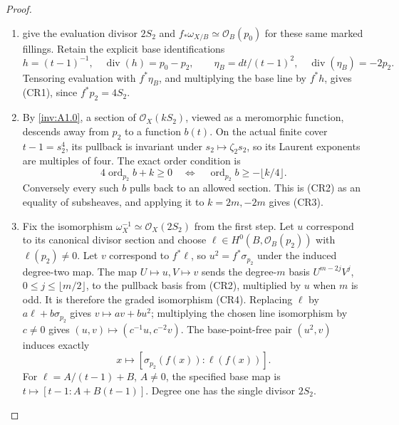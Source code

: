 \begin{proof}
\begin{enumerate}[label=\arabic*.,leftmargin=*]
\item \cite[Lemma~9.10(ii), p.~70, and Proposition~9.11,
pp.~70--71]{AC2026} give the evaluation divisor \(2S_2\) and
\(f_*\omega_{X/B}\simeq\mathcal O_B(p_0)\) for these same
marked fillings. Retain the explicit base identifications
\[
 h=(t-1)^{-1},\quad \operatorname{div}(h)=p_0-p_2,\qquad
 \eta_B=dt/(t-1)^2,\quad\operatorname{div}(\eta_B)=-2p_2.
\]
Tensoring evaluation with \(f^*\eta_B\), and multiplying the
base line by \(f^*h\), gives (CR1), since \(f^*p_2=4S_2\).

\item By \cref{inv:A1.0}, a section of
\(\mathcal O_X(kS_2)\), viewed as a meromorphic function,
descends away from \(p_2\) to a function \(b(t)\).
On the actual finite cover \(t-1=s_2^4\), its pullback is
invariant under \(s_2\mapsto\zeta_2s_2\), so its Laurent
exponents are multiples of four. The exact order condition is
\[
 4\operatorname{ord}_{p_2}b+k\ge0
 \quad\Longleftrightarrow\quad
 \operatorname{ord}_{p_2}b\ge-\lfloor k/4\rfloor.
\]
Conversely every such \(b\) pulls back to an allowed section.
This is (CR2) as an equality of subsheaves, and applying it
to \(k=2m,-2m\) gives (CR3).

\item Fix the isomorphism
\(\omega_X^{-1}\simeq\mathcal O_X(2S_2)\) from the first step.
Let \(u\) correspond to its canonical divisor section and
choose \(\ell\in H^0(B,\mathcal O_B(p_2))\) with
\(\ell(p_2)\ne0\). Let \(v\) correspond to \(f^*\ell\), so
\(u^2=f^*\sigma_{p_2}\) under the induced degree-two map.
The map \(U\mapsto u,V\mapsto v\) sends the degree-\(m\)
basis \(U^{m-2j}V^j\), \(0\le j\le\lfloor m/2\rfloor\),
to the pullback basis from (CR2), multiplied by \(u\) when
\(m\) is odd. It is therefore the graded isomorphism (CR4).
Replacing \(\ell\) by \(a\ell+b\sigma_{p_2}\) gives
\(v\mapsto av+bu^2\); multiplying the chosen line isomorphism
by \(c\ne0\) gives \((u,v)\mapsto(c^{-1}u,c^{-2}v)\).
The base-point-free pair \((u^2,v)\) induces exactly
\[
 x\longmapsto[\sigma_{p_2}(f(x)):\ell(f(x))].
\]
For \(\ell=A/(t-1)+B\), \(A\ne0\), the specified base map is
\(t\mapsto[t-1:A+B(t-1)]\). Degree one has the single
divisor \(2S_2\).
\end{enumerate}
\end{proof}
